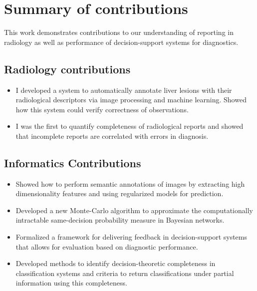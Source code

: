 \section{Summary of contributions}
This work demonstrates contributions to our understanding of reporting in radiology as well as performance of decision-support systems for diagnostics.

\subsection{Radiology contributions}

\begin{itemize}
	\item I developed a system to automatically annotate liver lesions with their radiological descriptors via image processing and machine learning. Showed how this system could verify correctness of observations.
	\item I was the first to quantify completeness of radiological reports and showed that incomplete reports are correlated with errors in diagnosis.
\end{itemize}

\subsection{Informatics Contributions}

\begin{itemize}
	\item Showed how to perform semantic annotations of images by extracting high dimensionality features and using regularized models for prediction.
	\item Developed a new Monte-Carlo algorithm to approximate the computationally intractable same-decision probability measure in Bayesian networks.
	\item Formalized a framework for delivering feedback in decision-support systems that allows for evaluation based on diagnostic performance.
	\item Developed methods to identify decision-theoretic completeness in classification systems and criteria to return classifications under partial information using this completeness.
\end{itemize}


